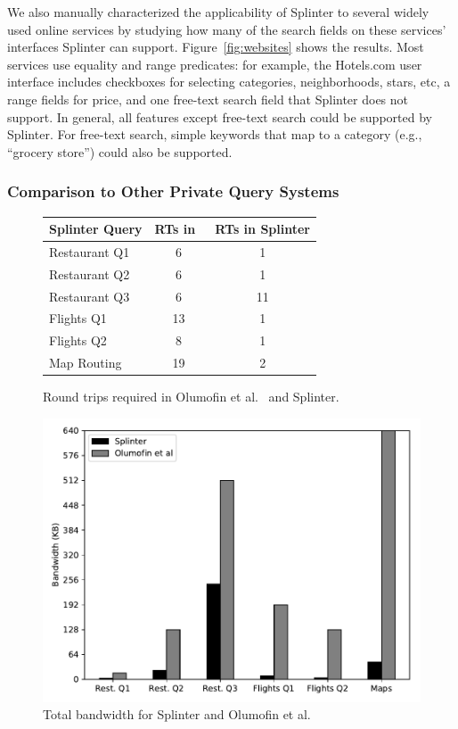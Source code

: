 We also manually characterized the applicability of Splinter to several widely used online services by studying how many of the search fields on these services' interfaces Splinter can support.
Figure~\ref{fig:websites} shows the results. 
Most services use equality and range predicates: for example, the
Hotels.com user interface includes checkboxes for selecting categories, neighborhoods, stars, etc, a range fields for price, and one free-text search field that Splinter does not support.
In general, all features except free-text search could be supported by Splinter.
For free-text search, simple keywords that map to a category (e.g., ``grocery store'') could also be supported.

\subsubsection{Comparison to Other Private Query Systems}
\label{sec:comparison}

\begin{figure}
	\centering
	\begin{tabular}{lcc}
		\toprule
		\bf Splinter Query & \bf RTs in~\cite{goldberg} & \bf RTs in Splinter \\
		\midrule
		Restaurant Q1 & 6 & 1 \\
		\midrule
		Restaurant Q2 & 6 & 1 \\ 
		\midrule
		Restaurant Q3 & 6 & 11 \\
		\midrule
		Flights Q1 & 13 & 1 \\
		\midrule
		Flights Q2 & 8 & 1 \\
		\midrule
		Map Routing & 19 & 2 \\
		\bottomrule
	\end{tabular}
	\caption{Round trips required in Olumofin et al.~\cite{goldberg} and Splinter.\protect\footnotemark}
	\label{fig:rt-comparison}
\end{figure}

\begin{figure}
	\centering
	\includegraphics[width=\textwidth]{splinter-figs/bandwidth_comparison.pdf}
	\caption{Total bandwidth for Splinter and Olumofin et al.~\cite{goldberg}}
	\label{fig:bandwidth_comp}
\end{figure}

